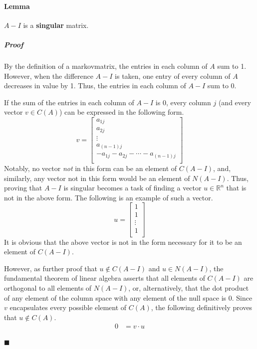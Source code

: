 \documentclass[titlepage]{article}
\newcounter{lemma}
\newcounter{theorem}
\newenvironment{lemma}[2]{
    \refstepcounter{lemma}\label{#1}
    \paragraph{Lemma \thelemma} #2

    \setlength{\leftskip}{15pt}
    \subparagraph{\hspace{-15pt}Proof}
}{

    \setlength{\leftskip}{0pt}
    \qed
}
\newcommand{\qed}{
    \begin{flushright}
        $\blacksquare$
    \end{flushright}
}
\begin{document}
\begin{lemma}{lma:A-I}{
    $A-I$ is a \textbf{\gls{singular}} matrix.
}
    By the definition of a \gls{markovmatrix}, the entries in each column of $A$ sum to 1. However, when the difference $A-I$ is taken, one entry of every column of $A$ decreases in value by 1. Thus, the entries in each column of $A-I$ sum to 0.\par
    If the sum of the entries in each column of $A-I$ is 0, every column $j$ (and every vector $v\in C(A)$) can be expressed in the following form.
    \begin{equation*}
        v =
        \begin{bmatrix}
            a_{1j}\\
            a_{2j}\\
            \vdots\\
            a_{(n-1)j}\\
            -a_{1j}-a_{2j}-\cdots-a_{(n-1)j}\\
        \end{bmatrix}
    \end{equation*}
    Notably, no vector \emph{not} in this form can be an element of $C(A-I)$, and, similarly, any vector not in this form would be an element of $N(A-I)$. Thus, proving that $A-I$ is \gls{singular} becomes a task of finding a vector $u\in\mathbb{R}^n$ that is not in the above form. The following is an example of such a vector.
    \begin{equation*}
        u =
        \begin{bmatrix}
            1\\
            1\\
            \vdots\\
            1\\
        \end{bmatrix}
    \end{equation*}
    It is obvious that the above vector is not in the form necessary for it to be an element of $C(A-I)$.\par
    However, as further proof that $u\notin C(A-I)$ and $u\in N(A-I)$, the fundamental theorem of linear algebra asserts that all elements of $C(A-I)$ are orthogonal to all elements of $N(A-I)$, or, alternatively, that the dot product of any element of the column space with any element of the null space is 0. Since $v$ encapsulates every possible element of $C(A)$, the following definitively proves that $u\notin C(A)$.
    \begin{align*}
        0 &= v\cdot u\\

\end{align*}
\end{lemma}
\end{document}
